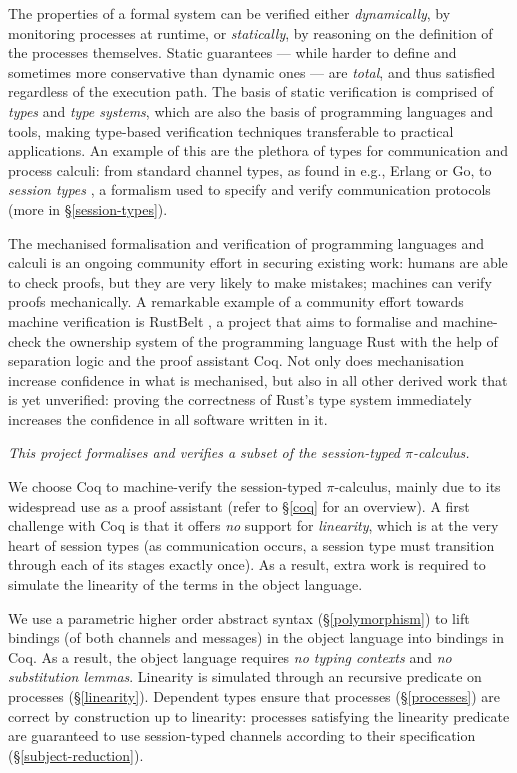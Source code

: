 \documentclass{mproj}
\newcommand{\picalc}{$\pi$-calculus}
\begin{document}
The properties of a formal system can be verified either \emph{dynamically}, by monitoring processes at runtime, or \emph{statically}, by reasoning on the definition of the processes themselves.  Static guarantees --- while harder to define and sometimes more conservative than dynamic ones --- are \emph{total}, and thus satisfied regardless of the execution path. The basis of static verification is comprised of \emph{types} and \emph{type systems}, which are also the basis of programming languages and tools, making type-based verification techniques transferable to practical applications. An example of this are the plethora of types for communication and process calculi: from standard channel types, as found in e.g., Erlang or Go, to \emph{session types} \cite{Honda1993, Takeuchi1994, Honda1998}, a formalism used to specify and verify communication protocols (more in \S \ref{session-types}).

The mechanised formalisation and verification of programming languages and calculi is an ongoing community effort in securing existing work: humans are able to check proofs, but they are very likely to make mistakes; machines can verify proofs mechanically. A remarkable example of a community effort towards machine verification is RustBelt \cite{Dreyer2018}, a project that aims to formalise and machine-check the ownership system of the programming language Rust with the help of separation logic \cite{} and the proof assistant Coq. Not only does mechanisation increase confidence in what is mechanised, but also in all other derived work that is yet unverified: proving the correctness of Rust's type system immediately increases the confidence in all software written in it.

\begin{center}
    \emph{This project formalises and verifies a subset of the session-typed \picalc{}.}
\end{center}

We choose Coq \cite{Coquand1990, CoqDeveloperCommunity} to machine-verify the session-typed \picalc{}, mainly due to its widespread use as a proof assistant (refer to \S \ref{coq} for an overview). A first challenge with Coq is that it offers \emph{no} support for \emph{linearity}, which is at the very heart of session types (as communication occurs, a session type must transition through each of its stages exactly once). As a result, extra work is required to simulate the linearity of the terms in the object language.

We use a parametric higher order abstract syntax \cite{Chlipala2008} (\S \ref{polymorphism}) to lift bindings (of both channels and messages) in the object language into bindings in Coq. As a result, the object language requires \emph{no typing contexts} and \emph{no substitution lemmas}. Linearity is simulated through an recursive predicate on processes (\S \ref{linearity}). Dependent types ensure that processes (\S \ref{processes}) are correct by construction up to linearity: processes satisfying the linearity predicate are guaranteed to use session-typed channels according to their specification (\S \ref{subject-reduction}).
\end{document}
